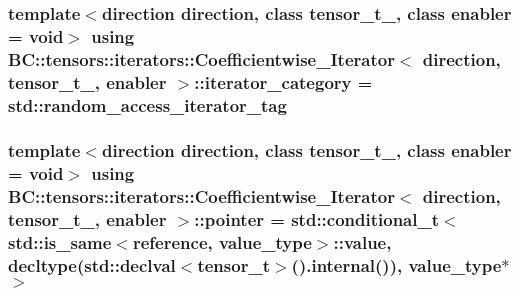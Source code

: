\subsubsection[{\texorpdfstring{iterator\+\_\+category}{iterator_category}}]{\setlength{\rightskip}{0pt plus 5cm}template$<$direction direction, class tensor\+\_\+t\+\_\+, class enabler = void$>$ using {\bf B\+C\+::tensors\+::iterators\+::\+Coefficientwise\+\_\+\+Iterator}$<$ {\bf direction}, tensor\+\_\+t\+\_\+, enabler $>$\+::{\bf iterator\+\_\+category} =  std\+::random\+\_\+access\+\_\+iterator\+\_\+tag}\hypertarget{structBC_1_1tensors_1_1iterators_1_1Coefficientwise__Iterator_a3f738632b48d6edd83ecffd1d3f9ba10}{}\label{structBC_1_1tensors_1_1iterators_1_1Coefficientwise__Iterator_a3f738632b48d6edd83ecffd1d3f9ba10}
\subsubsection[{\texorpdfstring{pointer}{pointer}}]{\setlength{\rightskip}{0pt plus 5cm}template$<$direction direction, class tensor\+\_\+t\+\_\+, class enabler = void$>$ using {\bf B\+C\+::tensors\+::iterators\+::\+Coefficientwise\+\_\+\+Iterator}$<$ {\bf direction}, tensor\+\_\+t\+\_\+, enabler $>$\+::{\bf pointer} =  std\+::conditional\+\_\+t$<$std\+::is\+\_\+same$<${\bf reference}, {\bf value\+\_\+type}$>$\+::value, decltype(std\+::declval$<${\bf tensor\+\_\+t}$>$().internal()), {\bf value\+\_\+type}$\ast$$>$}\hypertarget{structBC_1_1tensors_1_1iterators_1_1Coefficientwise__Iterator_a1221994e154ab3f77cb6a43198db8acc}{}\label{structBC_1_1tensors_1_1iterators_1_1Coefficientwise__Iterator_a1221994e154ab3f77cb6a43198db8acc}
